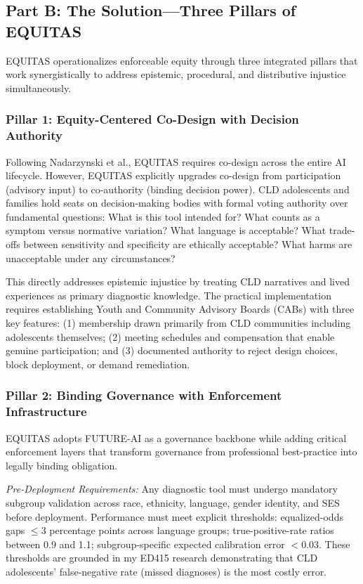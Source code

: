 \documentclass[12pt,a4paper]{article}
\begin{document}
\subsection{Part B: The Solution—Three Pillars of EQUITAS}

EQUITAS operationalizes enforceable equity through three integrated pillars that work synergistically to address epistemic, procedural, and distributive injustice simultaneously.

\subsubsection{Pillar 1: Equity-Centered Co-Design with Decision Authority}

Following Nadarzynski et al., EQUITAS requires co-design across the entire AI lifecycle.\cite{nadarzynski2024} However, EQUITAS explicitly upgrades co-design from participation (advisory input) to co-authority (binding decision power). CLD adolescents and families hold seats on decision-making bodies with formal voting authority over fundamental questions: What is this tool intended for? What counts as a symptom versus normative variation? What language is acceptable? What trade-offs between sensitivity and specificity are ethically acceptable? What harms are unacceptable under any circumstances?

This directly addresses epistemic injustice by treating CLD narratives and lived experiences as primary diagnostic knowledge.\cite{garcia_ed415} The practical implementation requires establishing Youth and Community Advisory Boards (CABs) with three key features: (1) membership drawn primarily from CLD communities including adolescents themselves; (2) meeting schedules and compensation that enable genuine participation; and (3) documented authority to reject design choices, block deployment, or demand remediation.\cite{nadarzynski2024}

\subsubsection{Pillar 2: Binding Governance with Enforcement Infrastructure}

EQUITAS adopts FUTURE-AI as a governance backbone while adding critical enforcement layers that transform governance from professional best-practice into legally binding obligation.\cite{lekadir2025}

\textit{Pre-Deployment Requirements:} Any diagnostic tool must undergo mandatory subgroup validation across race, ethnicity, language, gender identity, and SES before deployment.\cite{chen2023} Performance must meet explicit thresholds: equalized-odds gaps $\leq 3$ percentage points across language groups; true-positive-rate ratios between 0.9 and 1.1; subgroup-specific expected calibration error $< 0.03$.\cite{chen2023} These thresholds are grounded in my ED415 research demonstrating that CLD adolescents' false-negative rate (missed diagnoses) is the most costly error.\cite{garcia_ed415}
\end{document}
